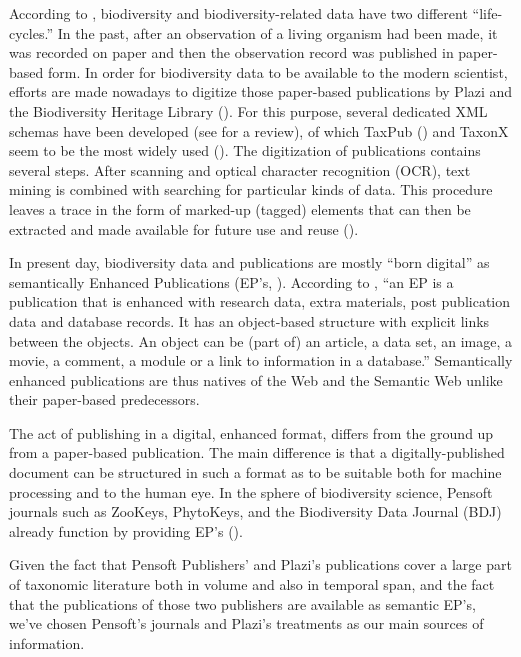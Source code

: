 According to \cite{soraya_sierra_coordination_2014}, biodiversity and biodiversity-related data have two different ``life-cycles.'' In the past, after an observation of a living organism had been made, it was recorded on paper and then the observation record was published in paper-based form. In order for biodiversity data to be available to the modern scientist, efforts are made nowadays to digitize those paper-based publications by Plazi \cite{agosti_why_2007} and the Biodiversity Heritage Library (\cite{miller_taxonomic_2012}). For this purpose, several dedicated XML schemas have been developed (see \cite{penev_xml_2011} for a review), of which TaxPub (\cite{catapano_taxpub:_2010}) and TaxonX  seem to be the most widely used (\cite{penev_implementation_2012}). The digitization of publications contains several steps. After scanning and optical character recognition (OCR), text mining is combined with searching for particular kinds of data. This procedure leaves a trace in the form of marked-up (tagged) elements that can then be extracted and made available for future use and reuse (\cite{miller_integrating_2015}).

In present day, biodiversity data and publications are mostly ``born digital'' as semantically Enhanced Publications (EP's, \cite{claerbout_electronic_1992,godtsenhoven_van_emerging_2009,shotton_semantic_2009}). According to \cite{claerbout_electronic_1992}, ``an EP is a publication that is enhanced with research data, extra materials, post publication data and database records. It has an object-based structure with explicit links between the objects. An object can be (part of) an article, a data set, an image, a movie, a comment, a module or a link to information in a database.'' Semantically enhanced publications are thus natives of the Web and the Semantic Web unlike their paper-based predecessors.

The act of publishing in a digital, enhanced format, differs from the ground up from a paper-based publication. The main difference is that a digitally-published document can be structured in such a format as to be suitable both for machine processing and to the human eye. In the sphere of biodiversity science, Pensoft journals such as ZooKeys, PhytoKeys, and the Biodiversity Data Journal (BDJ) already function by providing EP's (\cite{penev_semantic_2010}).

Given the fact that Pensoft Publishers' and Plazi's publications cover a large part of taxonomic literature both in volume and also in temporal span, and the fact that the publications of those two publishers are available as semantic EP's, we've chosen Pensoft's journals and Plazi's treatments as our main sources of information.

